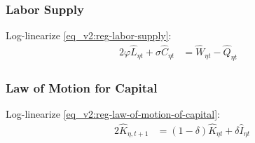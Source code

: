 \documentclass[../thesis.tex]{subfiles}
\begin{document}
\subsubsection*{Labor Supply}

Log-linearize \ref{eq_v2:reg-labor-supply}:
\begin{alignat}{2}
	\varphi \hat{L}_{\eta t} + \sigma \hat{C}_{\eta t} &= \hat{W}_{\eta t} - \hat{Q}_{\eta t} & \label{eq_v2:reg-ll-labor-supply}
\end{alignat}


\subsubsection*{Law of Motion for Capital}

Log-linearize \ref{eq_v2:reg-law-of-motion-of-capital}:
\begin{alignat}{2}
	\hat{K}_{\eta, t+1} &= (1-\delta) \hat{K}_{\eta t} + \delta \hat{I}_{\eta t} \label{eq_v2:reg-ll-law-of-motion-for-capital}
\end{alignat}

\end{document}
